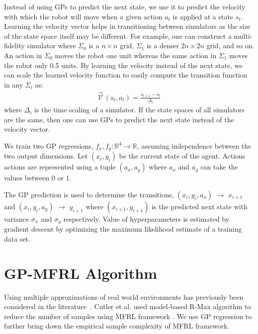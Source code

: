\documentclass[12pt]{report}
\begin{document}
Instead of using GPs to predict the next state, we use it to predict the velocity with which the robot will move when a given action $a_t$ is applied at a state $s_t$. Learning the velocity vector helps in transitioning between simulators as the size of the state space itself may be different. For example, one can construct a multi-fidelity simulator where $\Sigma_0$ is a $n\times n$ grid, $\Sigma_1$ is a denser $2n\times 2n$ grid, and so on. An action in $\Sigma_0$ moves the robot one unit whereas the same action in $\Sigma_1$ moves the robot only 0.5 units. By learning the velocity instead of the next state, we can scale the learned velocity function to easily compute the transition function in any $\Sigma_i$ as:
\begin{equation} \label{velocity_def}
\begin{split}
\vec{\mathcal{V}} \ (s_t,a_t) = \frac{s_{t+1}-s_t}{\Delta_i} 
\end{split}
\end{equation}
where $\Delta_i$ is the time scaling of a simulator. If the state spaces of all simulators are the same, then one can use GPs to predict the next state instead of the velocity vector.

We train two GP regressions, $f_x,f_y:\mathbb{R}^4\rightarrow\mathbb{R}$, assuming independence between the two output dimensions. Let $(x_i,y_i)$ be the current state of the agent. Actions actions are represented using a tuple $(a_x,a_y)$ where $a_x$ and $a_y$ can take the values between $0$ or $1$. 

The GP prediction is used to determine the transitions, $(x_i,y_i,a_x)$ $\rightarrow$ $x_{i+1}$ and $(x_i,y_i,a_y)$ $\rightarrow$ $y_{i+1}$ where $(x_{i+1},y_{i+1})$ is the predicted next state with variance $\sigma_x$ and $\sigma_y$ respectively. Value of hyperparameters is estimated by gradient descent by optimizing the maximum likelihood estimate of a training data set. 


\section{GP-MFRL Algorithm}

Using multiple approximations of real world environments has previously been considered in the literature~\cite{abbeel2006using,taylor2007transfer}. Cutler et al. used model-based R-Max algorithm to reduce the number of samples using MFRL framework \cite{cutler2014reinforcement}. We use GP regression to further bring down the empirical sample complexity of MFRL framework. 
\end{document}
